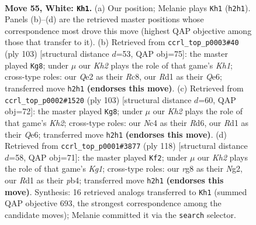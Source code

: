 \documentclass[11pt]{article}
\begin{document}
\clearpage

\begin{figure}[p]\centering
\begin{subfigure}{0.46\textwidth}\centering
\resizebox{\linewidth}{!}{%
\newchessgame
\chessboard[
  setfen={1q4r1/3n3k/8/1P5p/p1Np4/P7/4Q2K/3R4 w - - 5 55},
  showmover=false,
  pgfstyle=straightmove, color=movearrow, markmove={h2-h1}
]}
\caption{}
\end{subfigure}\hfill
\begin{subfigure}{0.46\textwidth}\centering
\resizebox{\linewidth}{!}{%
\newchessgame
\chessboard[
  setfen={2r4k/1p6/4q3/P2Np1b1/6P1/7R/4Q3/7K b - - 0 52},
  showmover=false,
  pgfstyle=straightmove, color=movearrow, markmove={h8-g8}
]}
\caption{}
\end{subfigure}
\\[4pt]
\begin{subfigure}{0.46\textwidth}\centering
\resizebox{\linewidth}{!}{%
\newchessgame
\chessboard[
  setfen={8/1Q5k/3rqn1p/4Np2/8/6P1/5P1K/4R3 b - - 6 52},
  showmover=false,
  pgfstyle=straightmove, color=movearrow, markmove={h7-g8}
]}
\caption{}
\end{subfigure}\hfill
\begin{subfigure}{0.46\textwidth}\centering
\resizebox{\linewidth}{!}{%
\newchessgame
\chessboard[
  setfen={6k1/6n1/PQ5p/3p3P/1p2p1P1/8/6N1/q5K1 w - - 3 60},
  showmover=false,
  pgfstyle=straightmove, color=movearrow, markmove={g1-f2}
]}
\caption{}
\end{subfigure}
\caption{\textbf{Move 55, White: \texttt{Kh1}.} (a) Our position; Melanie plays \texttt{Kh1} (\texttt{h2h1}). Panels (b)--(d) are the retrieved master positions whose correspondence most drove this move (highest QAP objective among those that transfer to it). (b) Retrieved from \texttt{ccrl\_top\_p0003\#40} (ply 103) [structural distance $d$=53, QAP obj=75]: the master played \texttt{Kg8}; under $\mu$ our \emph{Kh2} plays the role of that game's \emph{Kh1}; cross-type roles: our \emph{Q}e2 as their \emph{R}c8, our \emph{R}d1 as their \emph{Q}e6; transferred move \texttt{h2h1} \textbf{(endorses this move)}. (c) Retrieved from \texttt{ccrl\_top\_p0002\#1520} (ply 103) [structural distance $d$=60, QAP obj=72]: the master played \texttt{Kg8}; under $\mu$ our \emph{Kh2} plays the role of that game's \emph{Kh2}; cross-type roles: our \emph{N}c4 as their \emph{R}d6, our \emph{R}d1 as their \emph{Q}e6; transferred move \texttt{h2h1} \textbf{(endorses this move)}. (d) Retrieved from \texttt{ccrl\_top\_p0001\#3877} (ply 118) [structural distance $d$=58, QAP obj=71]: the master played \texttt{Kf2}; under $\mu$ our \emph{Kh2} plays the role of that game's \emph{Kg1}; cross-type roles: our \emph{r}g8 as their \emph{N}g2, our \emph{R}d1 as their \emph{p}b4; transferred move \texttt{h2h1} \textbf{(endorses this move)}. Synthesis: 16 retrieved analogs transferred to \texttt{Kh1} (summed QAP objective 693, the strongest correspondence among the candidate moves); Melanie committed it via the \texttt{search} selector.}
\label{fig:thought-m108}
\end{figure}
\end{document}
